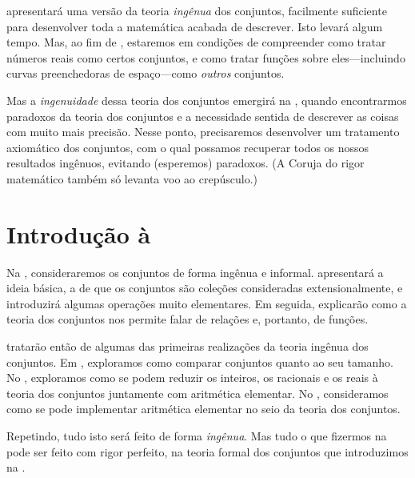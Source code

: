  apresentará uma versão da teoria \emph{ingênua} dos
conjuntos, facilmente suficiente para desenvolver toda a matemática
acabada de descrever. Isto levará algum tempo. Mas, ao fim de
, estaremos em condições de compreender como tratar
números reais como certos conjuntos, e como tratar funções sobre
eles---incluindo curvas preenchedoras de espaço---como \emph{outros}
conjuntos.

Mas a \emph{ingenuidade} dessa teoria dos conjuntos emergirá na
, quando encontrarmos paradoxos da teoria dos conjuntos
e a necessidade sentida de descrever as coisas com muito mais precisão.
Nesse ponto, precisaremos desenvolver um tratamento axiomático dos
conjuntos, com o qual possamos recuperar todos os nossos resultados
ingênuos, evitando (esperemos) paradoxos. (A Coruja do rigor matemático
também só levanta voo ao crepúsculo.)

\OLEndChapterHook


\section*{Introdução à }

Na , consideraremos os conjuntos de forma ingênua e
informal.  apresentará a ideia básica, a de que os
conjuntos são coleções consideradas extensionalmente, e introduzirá algumas
operações muito elementares. Em seguida,
 explicarão como a teoria dos conjuntos
nos permite falar de relações e, portanto, de funções.

 tratarão então de algumas das
primeiras realizações da teoria ingênua dos conjuntos. Em
, exploramos como comparar conjuntos quanto ao seu
tamanho. No , exploramos como se podem reduzir os
inteiros, os racionais e os reais à teoria dos conjuntos juntamente com
aritmética elementar. No , consideramos como se
pode implementar aritmética elementar no seio da teoria dos conjuntos.

Repetindo, tudo isto será feito de forma \emph{ingênua}. Mas tudo o que
fizermos na  pode ser feito com rigor perfeito, na teoria
formal dos conjuntos que introduzimos na .


